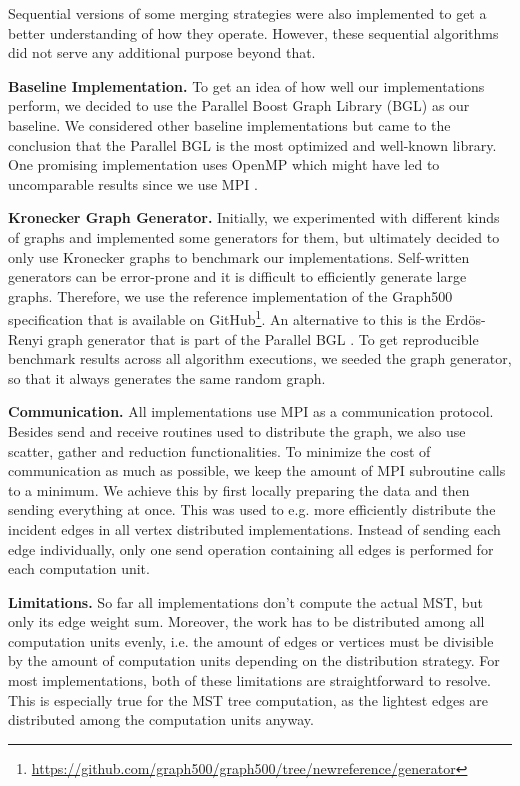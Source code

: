 \documentclass[letterpaper]{article}
\newcommand{\mypar}[1]{{\bf #1.}}
\begin{document}
Sequential versions of some merging strategies were also implemented to get a better understanding of how they operate.
However, these sequential algorithms did not serve any additional purpose beyond that.

\mypar{Baseline Implementation}
To get an idea of how well our implementations perform, we decided to use the Parallel Boost Graph Library (BGL)
\cite{bgl} as our baseline. We considered other baseline implementations but came to the conclusion that the Parallel
BGL is the most optimized and well-known library. One promising implementation uses OpenMP which might have led to
uncomparable results since we use MPI \cite{15418}.

\mypar{Kronecker Graph Generator}
\label{par:kronecker_graph_generator}
Initially, we experimented with different kinds of graphs and implemented some generators for them, but ultimately
decided to only use Kronecker graphs to benchmark our implementations. Self-written generators can be error-prone and it
is difficult to efficiently generate large graphs. Therefore, we use the reference implementation of the Graph500
specification that is available on
GitHub\footnote{\url{https://github.com/graph500/graph500/tree/newreference/generator}}. An alternative to this is the
Erdös-Renyi graph generator that is part of the Parallel BGL \cite{bgl}. To get reproducible benchmark results across
all algorithm executions, we seeded the graph generator, so that it always generates the same random graph.

\mypar{Communication}
All implementations use MPI as a communication protocol. Besides send and receive routines used to distribute the graph,
we also use scatter, gather and reduction functionalities. To minimize the cost of communication as much as possible, we
keep the amount of MPI subroutine calls to a minimum. We achieve this by first locally preparing the data and then
sending everything at once. This was used to e.g. more efficiently distribute the incident edges in all vertex
distributed implementations. Instead of sending each edge individually, only one send operation containing all edges is
performed for each computation unit.

\mypar{Limitations}
\label{par:limitation}
So far all implementations don't compute the actual MST, but only its edge weight sum. Moreover, the work has to be
distributed among all computation units evenly, i.e. the amount of edges or vertices must be divisible by the amount of
computation units depending on the distribution strategy. For most implementations, both of these limitations are
straightforward to resolve. This is especially true for the MST tree computation, as the lightest edges are distributed
among the computation units anyway.
\end{document}
